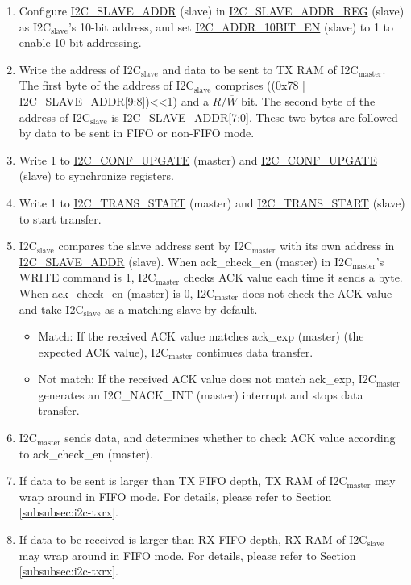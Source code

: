 \documentclass[main\_\_EN.tex]{subfiles}
\begin{document}
\begin{enumerate}
\item Configure \hyperref[fielddesc:I2CSLAVEADDR]{I2C\_SLAVE\_ADDR} (slave) in \hyperref[regdesc:I2CSLAVEADDRREG]{I2C\_SLAVE\_ADDR\_REG} (slave) as I2C$_\text{slave}$'s 10-bit address, and set \hyperref[fielddesc:I2CADDR10BITEN]{I2C\_ADDR\_10BIT\_EN} (slave) to 1 to enable 10-bit addressing.
\item Write the address of I2C$_\text{slave}$ and data to be sent to TX RAM of I2C$_\text{master}$. The first byte of the address of I2C$_\text{slave}$ comprises ((0x78 | \hyperref[fielddesc:I2CSLAVEADDR]{I2C\_SLAVE\_ADDR}[9:8])<<1) and a $R/\overline W$ bit. The second byte of the address of I2C$_\text{slave}$ is \hyperref[fielddesc:I2CSLAVEADDR]{I2C\_SLAVE\_ADDR}[7:0]. These two bytes are followed by data to be sent in FIFO or non-FIFO mode.
\item Write 1 to \hyperref[fielddesc:I2CCONFUPGATE]{I2C\_CONF\_UPGATE} (master) and \hyperref[fielddesc:I2CCONFUPGATE]{I2C\_CONF\_UPGATE} (slave) to synchronize registers.
\item Write 1 to \hyperref[fielddesc:I2CTRANSSTART]{I2C\_TRANS\_START} (master) and \hyperref[fielddesc:I2CTRANSSTART]{I2C\_TRANS\_START} (slave) to start transfer.
\item I2C$_\text{slave}$ compares the slave address sent by I2C$_\text{master}$ with its own address in \hyperref[fielddesc:I2CSLAVEADDR]{I2C\_SLAVE\_ADDR} (slave). When ack\_check\_en (master) in I2C$_\text{master}$'s WRITE command is 1, I2C$_\text{master}$ checks ACK value each time it sends a byte. When ack\_check\_en (master) is 0, I2C$_\text{master}$ does not check the ACK value and take I2C$_\text{slave}$ as a matching slave by default.
\begin{itemize}
\item Match: If the received ACK value matches ack\_exp (master) (the expected ACK value), I2C$_\text{master}$ continues data transfer.
\item Not match: If the received ACK value does not match ack\_exp, I2C$_\text{master}$ generates an I2C\_NACK\_INT (master) interrupt and stops data transfer.
\end{itemize}


\item I2C$_\text{master}$ sends data, and determines whether to check ACK value according to ack\_check\_en (master).

\item If data to be sent is larger than TX FIFO depth, TX RAM of I2C$_\text{master}$ may wrap around in FIFO mode. For details, please refer to Section \ref{subsubsec:i2c-txrx}.
\item If data to be received is larger than RX FIFO depth, RX RAM of I2C$_\text{slave}$ may wrap around in FIFO mode. For details, please refer to Section \ref{subsubsec:i2c-txrx}.


\end{enumerate}
\end{document}
